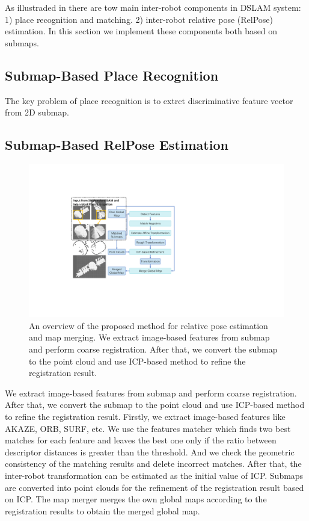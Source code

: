 \label{sec:dslam}
As illustraded in  there are tow main inter-robot components in DSLAM system: 1) place recognition and matching. 2) inter-robot relative pose (RelPose) estimation. In this section we implement these components both based on submaps.

\subsection{Submap-Based Place Recognition}
The key problem of place recognition is to extrct discriminative feature vector from 2D submap.

\subsection{Submap-Based RelPose Estimation}

\begin{figure}[t]
    \includegraphics[width=0.99\linewidth]{fig/registration.pdf}
    \caption{An overview of the proposed method for relative pose estimation and map merging. 
    We extract image-based features from submap and perform coarse registration. 
    After that, we convert the submap to the point cloud and use ICP-based method to refine the registration result.}
    \label{fig:registration}
\end{figure}

We extract image-based features from submap and perform coarse registration. 
After that, we convert the submap to the point cloud and use ICP-based method to refine the registration result.
Firstly, we extract image-based features like AKAZE, ORB, SURF, etc.
We use the features matcher which finds two best matches for each feature and leaves the best one only if the ratio between descriptor distances is greater than the threshold.
And we check the geometric consistency of the matching results and delete incorrect matches.
After that, the inter-robot transformation can be estimated as the initial value of ICP.
Submaps are converted into point clouds for the refinement of the registration result based on ICP.
The map merger merges the own global maps according to the registration results to obtain the merged global map.